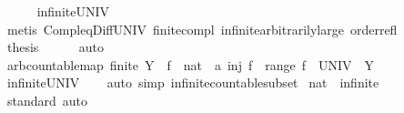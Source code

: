 \begin{isabellebody}
\ \ \ \ \isamarkupfalse%
\ infinite{\isacharunderscore}{\kern0pt}UNIV\isanewline
\ \ \ \ \isamarkupfalse%
\ {\isacharparenleft}{\kern0pt}metis\ Compl{\isacharunderscore}{\kern0pt}eq{\isacharunderscore}{\kern0pt}Diff{\isacharunderscore}{\kern0pt}UNIV\ finite{\isacharunderscore}{\kern0pt}compl\ infinite{\isacharunderscore}{\kern0pt}arbitrarily{\isacharunderscore}{\kern0pt}large\ order{\isacharunderscore}{\kern0pt}refl{\isacharparenright}{\kern0pt}\isanewline
\ \ \isamarkupfalse%
\ \isamarkupfalse%
\ {\isacharquery}{\kern0pt}thesis\isanewline
\ \ \ \ \isamarkupfalse%
\ auto\isanewline
{}\isamarkupfalse%
%
\endisatagproof
{\isafoldproof}%
%
\isadelimproof
\isanewline
%
\endisadelimproof
\isanewline
{}\isamarkupfalse%
\ arb{\isacharunderscore}{\kern0pt}countable{\isacharunderscore}{\kern0pt}map{\isacharcolon}{\kern0pt}\ {\isachardoublequoteopen}finite\ Y\ {\isasymLongrightarrow}\ {\isasymexists}f\ {\isacharcolon}{\kern0pt}{\isacharcolon}{\kern0pt}\ {\isacharparenleft}{\kern0pt}nat\ {\isasymRightarrow}\ {\isacharprime}{\kern0pt}a{\isacharparenright}{\kern0pt}{\isachardot}{\kern0pt}\ inj\ f\ {\isasymand}\ range\ f\ {\isasymsubseteq}\ UNIV\ {\isacharminus}{\kern0pt}\ Y{\isachardoublequoteclose}\isanewline
%
\isadelimproof
\ \ %
\endisadelimproof
%
\isatagproof
{}\isamarkupfalse%
\ infinite{\isacharunderscore}{\kern0pt}UNIV\isanewline
\ \ \isamarkupfalse%
\ {\isacharparenleft}{\kern0pt}auto\ simp{\isacharcolon}{\kern0pt}\ infinite{\isacharunderscore}{\kern0pt}countable{\isacharunderscore}{\kern0pt}subset{\isacharparenright}{\kern0pt}%
\endisatagproof
{\isafoldproof}%
%
\isadelimproof
\isanewline
%
\endisadelimproof
\isanewline
{}\isamarkupfalse%
\isanewline
\isanewline
{}\isamarkupfalse%
\ nat\ {\isacharcolon}{\kern0pt}{\isacharcolon}{\kern0pt}\ infinite\isanewline
%
\isadelimproof
\ \ %
\endisadelimproof
%
\isatagproof
{}\isamarkupfalse%
\ standard\ auto%
\endisatagproof
{\isafoldproof}%
%
\isadelimproof
\isanewline
%
\endisadelimproof
%
\isadelimtheory
\isanewline
%
\endisadelimtheory
%
\isatagtheory
{}\isamarkupfalse%
%
\endisatagtheory
{\isafoldtheory}%
%
\isadelimtheory
%
\endisadelimtheory
%
\end{isabellebody}%
\endinput
